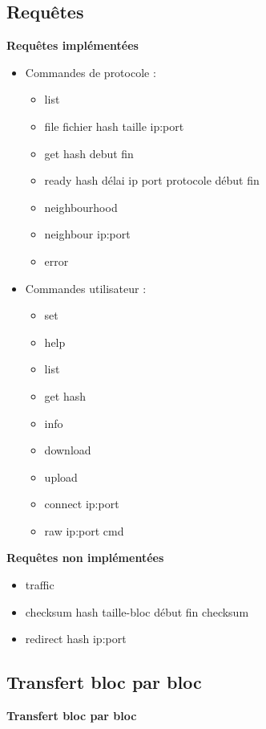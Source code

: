 \documentclass{beamer}
\begin{document}
\begin{frame}
    \section{Requêtes}

    \textbf{Requêtes implémentées}
    \begin{itemize}
        \item Commandes de protocole :
            \begin{itemize}
                \item list
                \item file fichier hash taille ip:port
                \item get hash debut fin
                \item ready hash délai ip port protocole début fin
                \item neighbourhood
                \item neighbour ip:port
                \item error
            \end{itemize}
        \item Commandes utilisateur :
            \begin{itemize}
                \item set
                \item help
                \item list
                \item get hash
                \item info
                \item download
                \item upload
                \item connect ip:port
                \item raw ip:port cmd
            \end{itemize}
    \end{itemize}
\end{frame}

\begin{frame}
    \textbf{Requêtes non implémentées}
    \begin{itemize}
        \item traffic
        \item checksum hash taille-bloc début fin checksum
        \item redirect hash ip:port
    \end{itemize}
\end{frame}

\begin{frame}
    \section{Transfert bloc par bloc}

    \textbf{Transfert bloc par bloc}
\end{frame}
\end{document}
